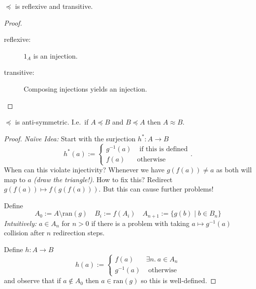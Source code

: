 \documentclass{whrartcl}
\newcommand{\ran}{\text{ran}}
\begin{document}
\begin{lemma}
  $\preceq$ is reflexive and transitive.
\end{lemma}
\begin{proof}
  \
  \begin{description}
  \item[reflexive:] $1_A$ is an injection.
  \item[transitive:] Composing injections yields an injection.
  \end{description}
\end{proof}

\begin{theorem}
  $\preceq$ is anti-symmetric. I.e.\ if $A \preceq B$ and $B \preceq A$ then $A \approx B$.
\end{theorem}
\begin{proof}
  \emph{Na\"ive Idea:} Start with the surjection $h^* : A \to B$
  \[
    h^*(a) :=
    \begin{cases}
      g^{-1}(a) & \text{ if this is defined} \\
      f(a) & \text{otherwise}
    \end{cases}.
  \]
  When can this violate injectivity? Whenever we have $g(f(a)) \neq a$ as both
  will map to $a$ \emph{(draw the triangle!)}. How to fix this? Redirect
  $g(f(a)) \mapsto f(g(f(a)))$. But this can cause further problems!

  Define
  \[
    A_0 := A \setminus \ran(g) \quad B_i := f(A_i) \quad A_{n + 1} := \{g(b)
    \mid b \in B_n\}
  \]
  \emph{Intuitively:} $a \in A_n$ for $n > 0$ if there is a problem with taking
  $a \mapsto g^{-1}(a)$ collision after $n$ redirection steps.

  Define $h : A \to B$
  \[
    h(a) :=
    \begin{cases}
      f(a) & \exists n.~a \in A_n \\
      g^{-1}(a) & \text{ otherwise}
    \end{cases}
  \]
  and observe that if $a \not\in A_0$ then $a \in \ran(g)$ so this is well-defined.


\end{proof}
\end{document}
